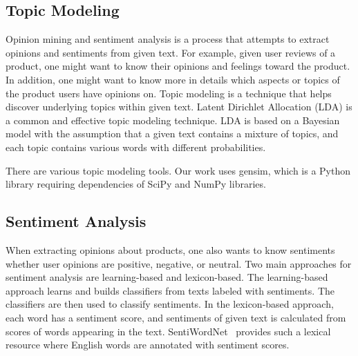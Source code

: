 

\subsection{Topic Modeling}

Opinion mining and sentiment analysis is a process that attempts to extract opinions and sentiments from given text\cite{surveyopinionmining}. For example, given user reviews of a product, one might want to know their opinions and feelings toward the product. In addition, one might want to know more in details which aspects or topics of the product users have opinions on. Topic modeling is a technique that helps discover underlying topics within given text. Latent Dirichlet Allocation (LDA)\cite{LDA} is a common and effective topic modeling technique. LDA is based on a Bayesian model with the assumption that a given text contains a mixture of topics, and each topic contains various words with different probabilities.

There are various topic modeling tools. Our work uses gensim\cite{gensim}, which is a Python library requiring dependencies of SciPy and NumPy libraries.

\subsection{Sentiment Analysis}

When extracting opinions about products, one also wants to know sentiments whether user opinions are positive, negative, or neutral. Two main approaches for sentiment analysis are learning-based and lexicon-based. The learning-based approach learns and builds classifiers from texts labeled with sentiments. The classifiers are then used to classify sentiments. In the lexicon-based approach, each word has a sentiment score, and sentiments of given text is calculated from scores of words appearing in the text. SentiWordNet~\cite{SentiWordNet} provides such a lexical resource where English words are annotated with sentiment scores. 













